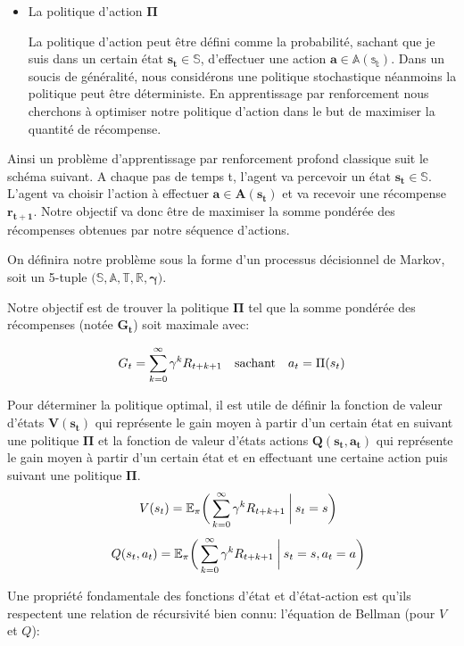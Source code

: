 \begin{itemize}
    \item La politique d'action $\bm{\Pi}$
    
    La politique d'action peut être défini comme la probabilité, sachant que je suis dans un certain état $\bm{s_t \in \mathbb{S}}$, d'effectuer une action $\bm{a \in \mathbb{A(s_t)}}$.
    Dans un soucis de généralité, nous considérons une politique stochastique néanmoins la politique peut être déterministe. En apprentissage par renforcement nous cherchons à optimiser notre politique d'action dans le but de maximiser la quantité de récompense.
        

\end{itemize}

Ainsi un problème d'apprentissage par renforcement profond classique suit le schéma suivant. A chaque pas de temps t, l'agent va percevoir un état $\bm{s_t \in \mathbb{S}}$. L'agent va choisir l'action à effectuer $\bm{a \in A(s_t)}$ et va recevoir une récompense $\bm{r_{t+1}}$. Notre objectif va donc être de maximiser la somme pondérée des récompenses obtenues par notre séquence d'actions. 


On définira notre problème sous la forme d'un processus décisionnel de Markov, soit un 5-tuple $\bm{\big(\mathbb{S}, \mathbb{A}, \mathbb{T}, \mathbb{R}, \gamma \big)}$.

Notre objectif est de trouver la politique $\bm{\Pi}$ tel que la somme pondérée des récompenses (notée $\bm{G_t}$) soit maximale avec:

\begin{align}
G_t = \sum_{k=0}^{\infty} \gamma^kR_{t+k+1} \quad \text{sachant} \quad a_t = \Pi(s_t)
\end{align}

Pour déterminer la politique optimal, il est utile de définir la fonction de valeur d'états $\bm{V(s_t)}$ qui représente le gain moyen à partir d'un certain état en suivant une  politique $\bm{\Pi}$ et la fonction de valeur d'états actions $\bm{Q(s_t, a_t)}$ qui représente le gain moyen à partir d'un certain état et en effectuant une certaine action puis suivant une  politique $\bm{\Pi}$.
\begin{gather}
\quad V(s_t) = \mathbb{E_\pi}\bigg(\sum_{k=0}^{\infty} \gamma^kR_{t+k+1} \:\bigg\vert\: s_t=s \bigg) \\[.1cm]
\quad  Q(s_t,a_t) = \mathbb{E_\pi}\bigg(\sum_{k=0}^{\infty} \gamma^kR_{t+k+1} \:\bigg\vert\: s_t=s, a_t=a \bigg)
\end{gather}


Une propriété fondamentale des fonctions d'état et d'état-action est qu'ils respectent une relation de récursivité bien connu: l'équation de Bellman (pour $V$ et $Q$):

